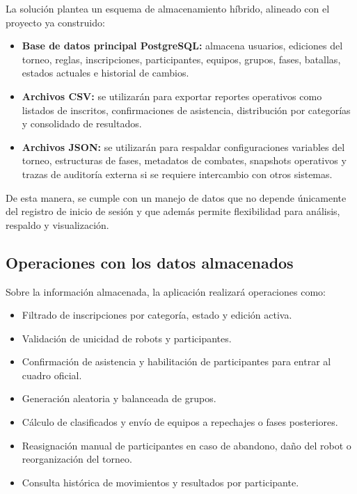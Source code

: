 \documentclass[12pt,a4paper]{article}
\begin{document}
La solución plantea un esquema de almacenamiento híbrido, alineado con el proyecto ya construido:

\begin{itemize}[leftmargin=1.2cm]
    \item \textbf{Base de datos principal PostgreSQL:} almacena usuarios, ediciones del torneo, reglas, inscripciones, participantes, equipos, grupos, fases, batallas, estados actuales e historial de cambios.
    \item \textbf{Archivos CSV:} se utilizarán para exportar reportes operativos como listados de inscritos, confirmaciones de asistencia, distribución por categorías y consolidado de resultados.
    \item \textbf{Archivos JSON:} se utilizarán para respaldar configuraciones variables del torneo, estructuras de fases, metadatos de combates, snapshots operativos y trazas de auditoría externa si se requiere intercambio con otros sistemas.
\end{itemize}

De esta manera, se cumple con un manejo de datos que no depende únicamente del registro de inicio de sesión y que además permite flexibilidad para análisis, respaldo y visualización.

\subsection{Operaciones con los datos almacenados}

Sobre la información almacenada, la aplicación realizará operaciones como:

\begin{itemize}[leftmargin=1.2cm]
    \item Filtrado de inscripciones por categoría, estado y edición activa.
    \item Validación de unicidad de robots y participantes.
    \item Confirmación de asistencia y habilitación de participantes para entrar al cuadro oficial.
    \item Generación aleatoria y balanceada de grupos.
    \item Cálculo de clasificados y envío de equipos a repechajes o fases posteriores.
    \item Reasignación manual de participantes en caso de abandono, daño del robot o reorganización del torneo.
    \item Consulta histórica de movimientos y resultados por participante.
\end{itemize}
\end{document}
